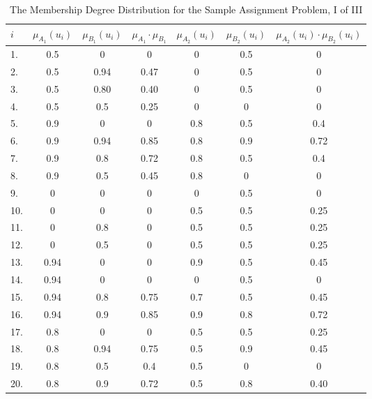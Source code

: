 \documentclass[a4paper,openany]{book}
\begin{document}
				\begin{table}[!th]
					\begin{center}
						\begin{tabular}{|l|c|c|c|c|c|c|}
							\hline
							\textbf{$i$} & \textbf{$\mu_{A_1}(u_i)$} & \textbf{$\mu_{B_1}(u_i)$} & \textbf{$\mu_{A_1}\cdot\mu_{B_1}$} & \textbf{$\mu_{A_2}(u_i)$} & \textbf{$\mu_{B_2}(u_i)$} & \textbf{$\mu_{A_2}(u_i)\cdot\mu_{B_2}(u_i)$}\\
							\hline
							1. & 0.5 & 0 & 0 & 0 & 0.5 & 0 \\
							\hline
							2. & 0.5 & 0.94 & 0.47 & 0 & 0.5 & 0 \\
							\hline
							3. & 0.5 & 0.80 & 0.40 & 0 & 0.5 & 0 \\
							\hline
							4. & 0.5 & 0.5 & 0.25 & 0 & 0 & 0 \\
							\hline
							5. & 0.9 & 0 & 0 & 0.8 & 0.5 & 0.4 \\
							\hline
							6. & 0.9 & 0.94 & 0.85 & 0.8 & 0.9 & 0.72 \\
							\hline
							7. & 0.9 & 0.8 & 0.72 & 0.8 & 0.5 & 0.4 \\
							\hline
							8. & 0.9 & 0.5 & 0.45 & 0.8 & 0 & 0 \\
							\hline
							9. & 0 & 0 & 0 & 0 & 0.5 & 0 \\
							\hline
							10. & 0 & 0 & 0 & 0.5 & 0.5 & 0.25 \\
							\hline
							11. & 0 & 0.8 & 0 & 0.5 & 0.5 & 0.25 \\
							\hline
							12. & 0 & 0.5 & 0 & 0.5 & 0.5 & 0.25 \\
							\hline
							13. & 0.94 & 0 & 0 & 0.9 & 0.5 & 0.45 \\
							\hline
							14. & 0.94 & 0 & 0 & 0 & 0.5 & 0 \\
							\hline
							15. & 0.94 & 0.8 & 0.75 & 0.7 & 0.5 & 0.45 \\
							\hline
							16. & 0.94 & 0.9 & 0.85 & 0.9 & 0.8 & 0.72 \\
							\hline
							17. & 0.8 & 0 & 0 & 0.5 & 0.5 & 0.25 \\
							\hline
							18. & 0.8 & 0.94 & 0.75 & 0.5 & 0.9 & 0.45 \\
							\hline
							19. & 0.8 & 0.5 & 0.4 & 0.5 & 0 & 0 \\
							\hline
							20. & 0.8 & 0.9 & 0.72 & 0.5 & 0.8 & 0.40 \\
							\hline
						\end{tabular}
						\caption{The Membership Degree Distribution for the Sample Assignment Problem, I of III}
						\label{ex:table2}
					\end{center}
				\end{table}
\end{document}
